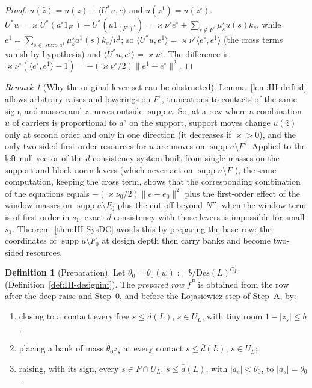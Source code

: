 \documentclass[10pt]{amsart}
\theoremstyle{definition}
\newtheorem{definition}[theorem]{Definition}
\theoremstyle{remark}
\newtheorem{remark}[theorem]{Remark}
\newcommand{\supp}{\operatorname{supp}}
\newcommand{\zh}{\hat z}
\newcommand{\ip}[2]{\langle #1,#2\rangle}
\begin{document}
\begin{proof}
$u(\zh)=u(z)+\ip{U^*u}{e}$ and $u(z^1)=u(z^\circ)$.  $U^*u=\varkappa U^*(a^\circ
1_{F^\circ})+U^*(u1_{(F^\circ)^c})=\varkappa\nu^\circ e^\circ+\sum_{s\notin F^\circ}
\mu^\star_su(s)k_s$, while $e^1=\sum_{s\in\supp a^1}\mu^\star_sa^1(s)k_s/\nu^1$; so
$\ip{U^*u}{e^1}=\varkappa\nu^\circ\ip{e^\circ}{e^1}$ (the cross terms vanish by
hypothesis) and $\ip{U^*u}{e^\circ}=\varkappa\nu^\circ$.  The difference is
$\varkappa\nu^\circ(\ip{e^\circ}{e^1}-1)=-(\varkappa\nu^\circ/2)\|e^1-e^\circ\|^2$.
\end{proof}

\begin{remark}[Why the original lever set can be obstructed]\label{rem:III-drift}
Lemma~\ref{lem:III-driftid} allows arbitrary raises and lowerings on $F^\circ$,
truncations to contacts of the same sign, and masses and $z$-moves outside
$\supp u$.  So, at a row where a combination $u$ of carriers is proportional to
$a^\circ$ on the support, support moves change $u(\zh)$ only at second order and
only in one direction (it decreases if $\varkappa>0$), and the only two-sided
first-order resources for $u$ are moves on $\supp u\setminus F^\circ$.  Applied
to the left null vector of the $d$-consistency system built from single masses
on the support and block-norm levers (which never act on $\supp u\setminus
F^\circ$), the same computation, keeping the cross term, shows that the
corresponding combination of the equations equals $-(\varkappa\nu_0/2)\|e-e_0\|^2$
plus the first-order effect of the window masses on $\supp u\setminus F_0$ plus
the cut-off beyond $N''$; when the window term is of first order in $s_1$,
exact $d$-consistency with those levers is impossible for small $s_1$.
Theorem~\ref{thm:III-SysDC} avoids this by preparing the base row: the
coordinates of $\supp u\setminus F_0$ at design depth then carry banks and
become two-sided resources.
\end{remark}

\begin{definition}[Preparation]\label{def:III-prep}
Let $\theta_0=\theta_0(w):=b/\mathrm{Des}(L)^{C_P}$ (Definition~\ref{def:III-designinf}).
The \emph{prepared row} $f^P$ is obtained from the row after the deep raise
and Step~0, and before the \L ojasiewicz step of Step~A, by:
\begin{enumerate}
\item[(P$_1$)] closing to a contact every free $s\le\bar d(L)$, $s\in U_L$,
with tiny room $1-|z_s|\le b$;
\item[(P$_2$)] placing a bank of mass $\theta_0z_s$ at every contact $s\le\bar
d(L)$, $s\in U_L$;
\item[(P$_3$)] raising, with its sign, every $s\in F\cap U_L$, $s\le\bar d(L)$,
with $|a_s|<\theta_0$, to $|a_s|=\theta_0$.
\end{enumerate}
\end{definition}
\end{document}
